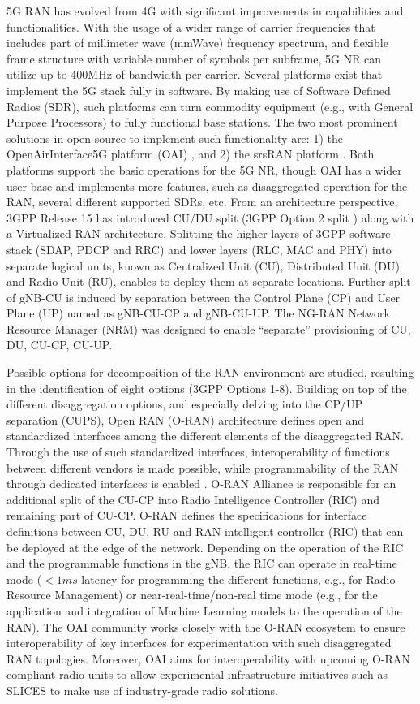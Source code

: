 5G RAN has evolved from 4G with significant improvements in capabilities and functionalities. With the usage of a wider range of carrier frequencies that includes part of millimeter wave (mmWave) frequency spectrum, and flexible frame structure with variable number of symbols per subframe, 5G NR can utilize up to 400MHz of bandwidth per carrier. Several platforms exist that implement the 5G stack fully in software. By making use of Software Defined Radios (SDR), such platforms can turn commodity equipment (e.g., with General Purpose Processors) to fully functional base stations. The two most prominent solutions in open source to implement such functionality are: 1) the OpenAirInterface5G platform (OAI) \cite{oai}, and 2) the srsRAN platform \cite{srs-ran}. Both platforms support the basic operations for the 5G NR, though OAI has a wider user base and implements more features, such as disaggregated operation for the RAN, several different supported SDRs, etc. From an architecture perspective, 3GPP Release 15 has introduced CU/DU split (3GPP Option 2 split \cite{functional-splits}) along with a Virtualized RAN architecture.  Splitting the higher layers of 3GPP software stack (SDAP, PDCP and RRC) and lower layers (RLC, MAC and PHY) into separate logical units, known as Centralized Unit (CU), Distributed Unit (DU) and Radio Unit (RU), enables to deploy them at separate locations. Further split of gNB-CU is induced by separation between the Control Plane (CP) and User Plane (UP) named as gNB-CU-CP and gNB-CU-UP. The NG-RAN Network Resource Manager (NRM) \cite{5g-nrm} was designed to enable “separate” provisioning of CU, DU, CU-CP, CU-UP. 

Possible options for decomposition of the RAN environment are studied, resulting in the identification of eight options (3GPP Options 1-8). Building on top of the different disaggregation options, and especially delving into the CP/UP separation (CUPS), Open RAN (O-RAN) architecture defines open and standardized interfaces among the different elements of the disaggregated RAN. Through the use of such standardized interfaces, interoperability of functions between different vendors is made possible, while programmability of the RAN through dedicated interfaces is enabled \cite{o-ran-controller}. O-RAN Alliance is responsible for an additional split of the CU-CP into Radio Intelligence Controller (RIC) and remaining part of CU-CP. O-RAN defines the specifications for interface definitions between CU, DU, RU and RAN intelligent controller (RIC) that can be deployed at the edge of the network. Depending on the operation of the RIC and the programmable functions in the gNB, the RIC can operate in real-time mode ($< 1ms$ latency for programming the different functions, e.g., for Radio Resource Management) or near-real-time/non-real time mode (e.g., for the application and integration of Machine Learning models to the operation of the RAN). The OAI community works closely with the O-RAN ecosystem to ensure interoperability of key interfaces for experimentation with such disaggregated RAN topologies. Moreover, OAI aims for interoperability with upcoming O-RAN compliant radio-units to allow experimental infrastructure initiatives such as SLICES to make use of industry-grade radio solutions.

